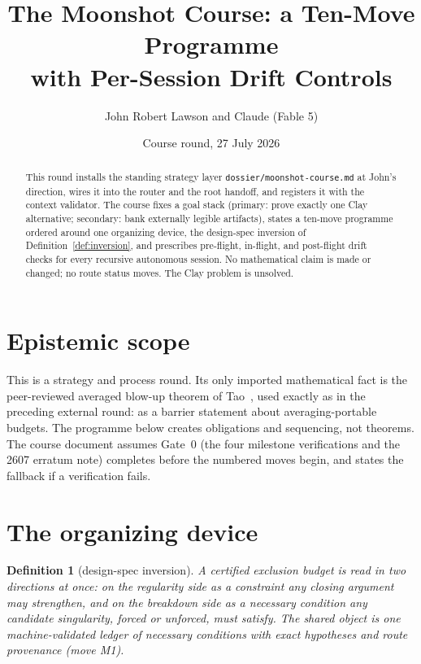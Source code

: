\documentclass[11pt]{article}
\title{The Moonshot Course: a Ten-Move Programme\\
with Per-Session Drift Controls}
\author{John Robert Lawson and Claude (Fable 5)}
\date{Course round, 27 July 2026}
\newtheorem{definition}[theorem]{Definition}
\theoremstyle{remark}
\begin{document}
\maketitle

\begin{abstract}
This round installs the standing strategy layer
\texttt{dossier/moonshot-course.md} at John's direction, wires it into
the router and the root handoff, and registers it with the context
validator.  The course fixes a goal stack (primary: prove exactly one
Clay alternative; secondary: bank externally legible artifacts), states
a ten-move programme ordered around one organizing device, the
design-spec inversion of Definition~\ref{def:inversion}, and prescribes
pre-flight, in-flight, and post-flight drift checks for every recursive
autonomous session.  No mathematical claim is made or changed; no route
status moves.  The Clay problem is unsolved.
\end{abstract}

\section{Epistemic scope}

This is a strategy and process round.  Its only imported mathematical
fact is the peer-reviewed averaged blow-up theorem of Tao~\cite{Tao16},
used exactly as in the preceding external round: as a barrier statement
about averaging-portable budgets.  The programme below creates
obligations and sequencing, not theorems.  The course document assumes
Gate~0 (the four milestone verifications and the 2607 erratum note)
completes before the numbered moves begin, and states the fallback if a
verification fails.

\section{The organizing device}

\begin{definition}[design-spec inversion]
\label{def:inversion}
A certified exclusion budget is read in two directions at once: on the
regularity side as a constraint any closing argument may strengthen,
and on the breakdown side as a necessary condition any candidate
singularity, forced or unforced, must satisfy.  The shared object is
one machine-validated ledger of necessary conditions with exact
hypotheses and route provenance (move M1).
\end{definition}
\end{document}
